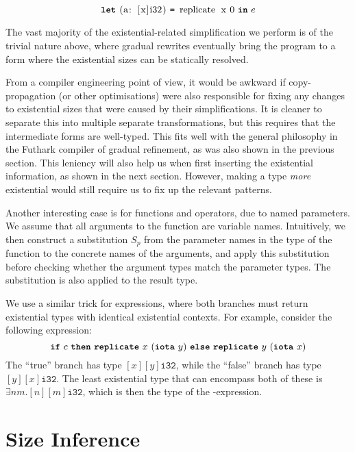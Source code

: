 \[
\Let{\mbox{\lstinline{(a: [x]i32)}}}{\mbox{\lstinline{replicate x 0}}}{e}
\]

The vast majority of the existential-related simplification we perform
is of the trivial nature above, where gradual rewrites eventually
bring the program to a form where the existential sizes can be
statically resolved.

From a compiler engineering point of view, it would be awkward if
copy-propagation (or other optimisations) were also responsible for
fixing any changes to existential sizes that were caused by their
simplifications.  It is cleaner to separate this into multiple
separate transformations, but this requires that the intermediate
forms are well-typed.  This fits well with the general philosophy in
the Futhark compiler of gradual refinement, as was also shown in the
previous section.  This leniency will also help us when first
inserting the existential information, as shown in the next section.
However, making a type \textit{more} existential would still require
us to fix up the relevant patterns.

Another interesting case is for functions and operators, due to named
parameters.  We assume that all arguments to the function are variable
names.  Intuitively, we then construct a substitution $S_{p}$ from the
parameter names in the type of the function to the concrete names of
the arguments, and apply this substitution before checking whether the
argument types match the parameter types.  The substitution is also
applied to the result type.

We use a similar trick for  expressions, where both branches
must return existential types with identical existential contexts.
For example, consider the following expression:
\[
  \mbox{\texttt{\bfseries{if}}}~c~\mbox{\texttt{\bfseries{then}}}~\mbox{\texttt{\bfseries{replicate}}}~x~(\mbox{\texttt{\bfseries{iota}}}~y)~\mbox{\texttt{\bfseries{else}}}~\mbox{\texttt{\bfseries{replicate}}}~y~(\mbox{\texttt{\bfseries{iota}}}~x)
\]
The ``true'' branch has type $[x][y]\texttt{i32}$, while the ``false''
branch has type $[y][x]\texttt{i32}$.  The least existential type that
can encompass both of these is $\exists n m.[n][m]\texttt{i32}$, which
is then the type of the -expression.

\section{Size Inference}
\label{sec:size-inference}

\newcommand{\transformBnd}[1]{\mathcal{A}_{#1}^{\text{exp}}}
\newcommand{\transformFun}{\mathcal{A}^{\text{fun}}}
\newcommand{\transformLam}[1]{\mathcal{A}_{#1}^{\text{lam}}}
\newcommand{\head}{\textrm{head}}
\newcommand{\tail}{\textrm{tail}}
\newcommand{\drop}{\textrm{drop}}
\newcommand{\cons}[2]{#1 :: #2}

